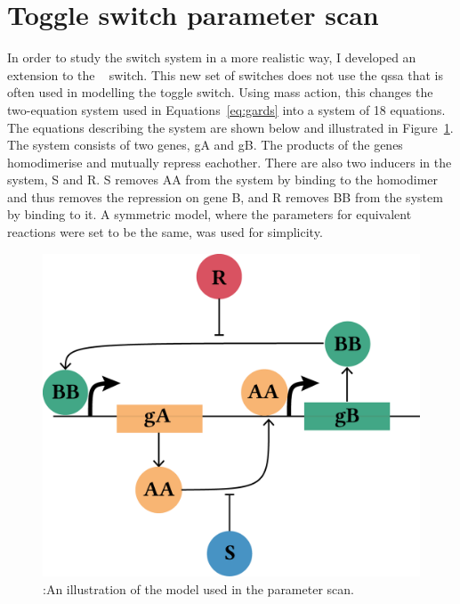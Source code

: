 \section{Toggle switch parameter scan}
\label{sec:paramscan}
In order to study the switch system in a more realistic way, I developed an extension to the ~\textcite{Gardner:2000vha} switch. This new set of switches does not use the \acrfull{qssa} that is often used in modelling the toggle switch. Using mass action, this changes the two-equation system used in Equations~\ref{eq:gards} into a system of 18 equations. The equations describing the system are shown below and illustrated in Figure~\ref{fig:Gard_MA}. The system consists of two genes, gA and gB. The products of the genes homodimerise and mutually repress eachother. There are also two inducers in the system, S and R. S removes AA from the system by binding to the homodimer and thus removes the repression on gene B, and R removes BB from the system by binding to it. A symmetric model, where the parameters for equivalent reactions were set to be the same, was used for simplicity.

\begin{figure}[tbp]
	\begin{center}
\includegraphics[scale=0.7]{../../chapters/chapterABCSysBio/images/ma-switch-diagram.png}
\caption[LoF caption]{\label{fig:Gard_MA}:An illustration of the model used in the parameter scan. }
\end{center}
\end{figure}



